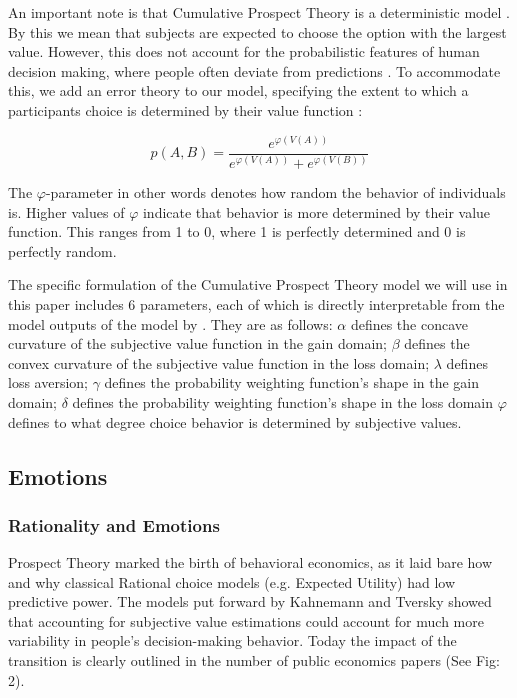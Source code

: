 \documentclass{article}
\begin{document}
An important note is that Cumulative Prospect Theory is a deterministic model \cite{nilsson2020jomp}. By this we mean that subjects are expected to choose the option with the largest value. However, this does not account for the probabilistic features of human decision making, where people often deviate from predictions \cite{nilsson2011jomp}. To accommodate this, we add an error theory to our model, specifying the extent to which a participants choice is determined by their value function \cite{nilsson2011jomp}:

$$p(A,B) = \frac{e^{\varphi(V(A))}}{e^{\varphi(V(A))} + e^{\varphi(V(B))}} $$

The $\varphi$-parameter in other words denotes how random the behavior of individuals is. Higher values of $\varphi$ indicate that behavior is more determined by their value function. This ranges from 1 to 0, where 1 is perfectly determined and 0 is perfectly random. 
 
The specific formulation of the Cumulative Prospect Theory model we will use in this paper includes 6 parameters, each of which is directly interpretable from the model outputs of the model by .
They are as follows:
$\alpha$ defines the concave curvature of the subjective value function in the gain domain;
$\beta$ defines the convex curvature of the subjective value function in the loss domain;
$\lambda$ defines loss aversion;
$\gamma$ defines the probability weighting function’s shape in the gain domain;
$\delta$ defines the probability weighting function’s shape in the loss domain
$\varphi$ defines to what degree choice behavior is determined by subjective values.


    \subsection{Emotions}
    \subsubsection{Rationality and Emotions}
    Prospect Theory marked the birth of behavioral economics, as it laid bare how and why classical Rational choice models (e.g. Expected Utility) had low predictive power. The models put forward by Kahnemann and Tversky showed that accounting for subjective value estimations could account for much more variability in people’s decision-making behavior. Today the impact of the transition is clearly outlined in the number of public economics papers \cite{kleven2018} (See Fig: 2).
\end{document}
